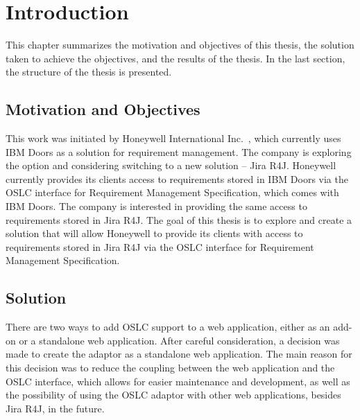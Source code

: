 
% 


\chapter{Introduction}
This chapter summarizes the motivation and objectives of this thesis, the solution taken to achieve the objectives, and the results of the thesis. In the last section, the structure of the thesis is presented.

\section{Motivation and Objectives}
This work was initiated by Honeywell International Inc. \cite{honeywell}, which currently uses IBM Doors as a solution for requirement management. The company is exploring the option and considering switching to a new solution -- Jira R4J. Honeywell currently provides its clients access to requirements stored in IBM Doors via the OSLC interface for Requirement Management Specification, which comes with IBM Doors. The company is interested in providing the same access to requirements stored in Jira R4J. The goal of this thesis is to explore and create a solution that will allow Honeywell to provide its clients with access to requirements stored in Jira R4J via the OSLC interface for Requirement Management Specification.

\section{Solution}
There are two ways to add OSLC support to a web application, either as an add-on or a standalone web application. After careful consideration, a decision was made to create the adaptor as a standalone web application. The main reason for this decision was to reduce the coupling between the web application and the OSLC interface, which allows for easier maintenance and development, as well as the possibility of using the OSLC adaptor with other web applications, besides Jira R4J, in the future. 

